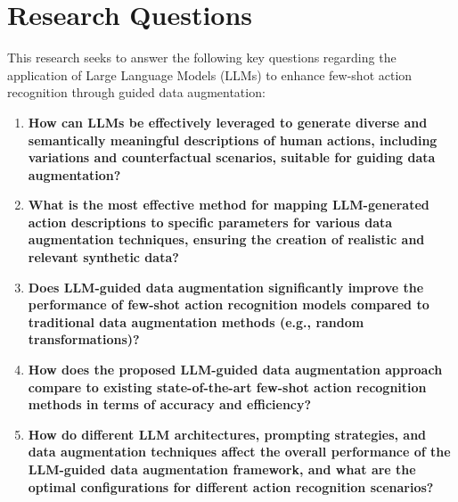 \section*{ Research Questions}

This research seeks to answer the following key questions regarding the application of Large Language Models (LLMs) to enhance few-shot action recognition through guided data augmentation:
\begin{enumerate}

    \item \textbf{How can LLMs be effectively leveraged to generate diverse and semantically meaningful descriptions of human actions, including variations and counterfactual scenarios, suitable for guiding data augmentation?}
    \item \textbf{What is the most effective method for mapping LLM-generated action descriptions to specific parameters for various data augmentation techniques, ensuring the creation of realistic and relevant synthetic data?}
    \item \textbf{Does LLM-guided data augmentation significantly improve the performance of few-shot action recognition models compared to traditional data augmentation methods (e.g., random transformations)? }
    \item \textbf{How does the proposed LLM-guided data augmentation approach compare to existing state-of-the-art few-shot action recognition methods in terms of accuracy and efficiency? }
    \item \textbf{How do different LLM architectures, prompting strategies, and data augmentation techniques affect the overall performance of the LLM-guided data augmentation framework, and what are the optimal configurations for different action recognition scenarios? }
    
\end{enumerate}